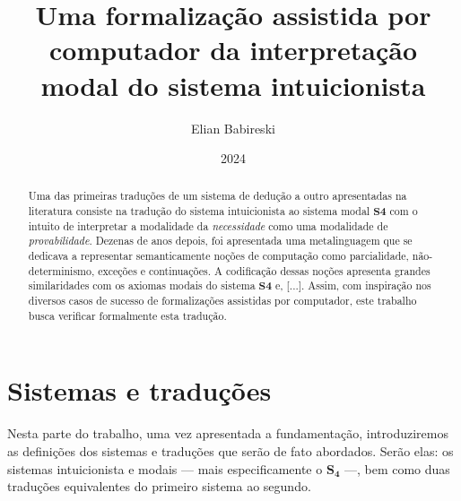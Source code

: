 


    \title{Uma formalização assistida por computador da interpretação modal do sistema intuicionista}
    \author{Elian Babireski}
    \date{2024}

    \maketitle

    \begin{abstract}
        Uma das primeiras traduções de um sistema de dedução a outro apresentadas na literatura consiste na tradução do sistema intuicionista ao sistema modal $\mathbf{S4}$ com o intuito de interpretar a modalidade da \emph{necessidade} como uma modalidade de \emph{provabilidade}. Dezenas de anos depois, foi apresentada uma metalinguagem que se dedicava a representar semanticamente noções de computação como parcialidade, não-determinismo, exceções e continuações. A codificação dessas noções apresenta grandes similaridades com os axiomas modais do sistema $\mathbf{S4}$ e, [...].  Assim, com inspiração nos diversos casos de sucesso de formalizações assistidas por computador, este trabalho busca verificar formalmente esta tradução.
    \end{abstract}

    \begin{otherlanguage}{english} 
        \begin{abstract}
            \lipsum[1]
        \end{abstract}
    \end{otherlanguage}

    \tableofcontents

    
    
    

    \chapter{Sistemas e traduções}

        Nesta parte do trabalho, uma vez apresentada a fundamentação, introduziremos as definições dos sistemas e traduções que serão de fato abordados. Serão elas: os sistemas intuicionista  e modais --- mais especificamente o $\mathbf{S_4}$ ---, bem como duas traduções equivalentes do primeiro sistema ao segundo.

        
        
        

